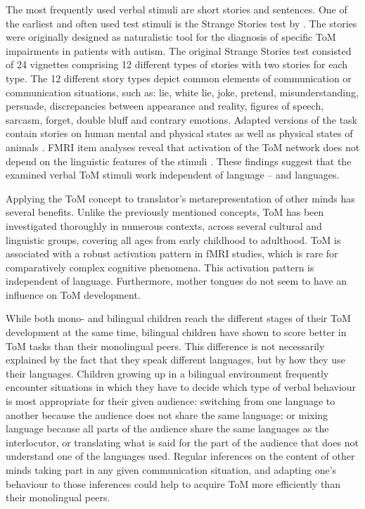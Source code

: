 \documentclass[output=paper]{LSP/langsci}
\begin{document}
The most frequently used verbal stimuli are short stories and sentences. One of the earliest and often used test stimuli is the Strange Stories test by \citet{Happe1994}. The stories were originally designed as naturalistic tool for the diagnosis of specific ToM impairments in patients with autism. The original Strange Stories test consisted of 24 vignettes comprising 12 different types of stories with two stories for each type. The 12 different story types depict common elements of communication or communication situations, such as: lie, white lie, joke, pretend, misunderstanding, persuade, discrepancies between appearance and reality, figures of speech, sarcasm, forget, double bluff and contrary emotions. Adapted versions of the task contain stories on human mental and physical states as well as physical states of animals \citep{White2009}. FMRI item analyses reveal that activation of the ToM network does not depend on the linguistic features of the stimuli \citep{DodellFeder2011}. These findings suggest that the examined verbal ToM stimuli work independent of language -- and languages. 


Applying the ToM concept to translator's metarepresentation of other minds has several benefits. Unlike the previously mentioned concepts, ToM has been investigated thoroughly in numerous contexts, across several cultural and linguistic groups, covering all ages from early childhood to adulthood. ToM is associated with a robust activation pattern in fMRI studies, which is rare for comparatively complex cognitive phenomena. This activation pattern is independent of language. Furthermore, mother tongues do not seem to have an influence on ToM development.


While both mono- and bilingual children reach the different stages of their ToM development at the same time, bilingual children have shown to score better in ToM tasks than their monolingual peers. This difference is not necessarily explained by the fact that they speak different languages, but by how they use their languages. Children growing up in a bilingual environment frequently encounter situations in which they have to decide which type of verbal behaviour is most appropriate for their given audience: switching from one language to another because the audience does not share the same language; or mixing language because all parts of the audience share the same languages as the interlocutor, or translating what is said for the part of the audience that does not understand one of the languages used. Regular inferences on the content of other minds taking part in any given communication situation, and adapting one's behaviour to those inferences could help  to acquire ToM more efficiently than their monolingual peers.
\end{document}
